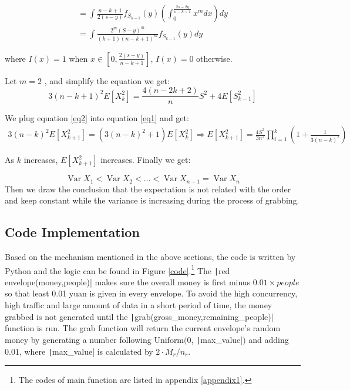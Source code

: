 \documentclass{scrartcl}
\begin{document}
$$
\begin{array}{l} = \int \frac{n-k+1}{2(s-y)} f_{S_{k-1}}(y)\left(\int_{0}^{\frac{2 s-2 y}{n-k+1}} x^{m} d x\right) d y \\ = \int \frac{2^{m}(S-y)^{m}}{(k+1)(n-k+1)^{m}} f_{S_{k-1}}(y) d y
\end{array}$$

where $I  (x) = 1$  when  $x \in\left[0, \frac{2(s-y)}{n-k+1}\right]$, $I(x) = 0$  otherwise.\par Let  $m = 2$ , and simplify the equation we get:
\begin{equation}
    3(n-k+1)^{2} E\left[X_{k}^{2}\right] = \frac{4(n-2 k+2)}{n} S^{2}+4 E\left[S_{k-1}^{2}\right]\label{eq2}
\end{equation}


We plug equation \eqref{eq2} into equation \eqref{eq1} and get:
$$
\begin{array}{c}
3(n-k)^{2} E\left[X_{k+1}^{2}\right] = \left(3(n-k)^{2}+1\right) E\left[X_{k}^{2}\right] 
\Rightarrow E\left[X_{k+1}^{2}\right] = \frac{4 S^{2}}{3 n^{2}} \prod_{i = 1}^{k}\left(1+\frac{1}{3(n-k)^{2}}\right)
\end{array}$$
\par
As $k$ increases, $E\left[X_{k+1}^{2}\right]$  increases. Finally we get:

$$\operatorname{Var} X_{1}<\operatorname{Var} X_{2}<\ldots<\operatorname{Var} X_{n-1} = \operatorname{Var} X_{n}$$
Then we draw the conclusion that the expectation is not related with the order and keep constant while the variance is increasing during the process of grabbing.


\subsection{Code Implementation}\label{sec3.3}
Based on the mechanism mentioned in the above sections, the code is written by Python and the logic can be found in Figure \ref{code}.\footnote{The codes of main function are listed in appendix \ref{appendix1}.} The \texttt|red envelope(money,people)|  makes sure the overall money is first minus $0.01\times people$ so that least 0.01 yuan is given in every envelope. To avoid the  high concurrency, high traffic and large amount of data in a short period of time, the money grabbed is not generated until the \texttt|grab(gross_money,remaining_people)| function is run. The grab function will return the current envelope's random money by generating a number following $\text{Uniform} (0$, \texttt|max_value|$)$ and adding $0.01$, where \texttt|max_value| is calculated by $2\cdot M_{r}/n_{r}$.
\end{document}
